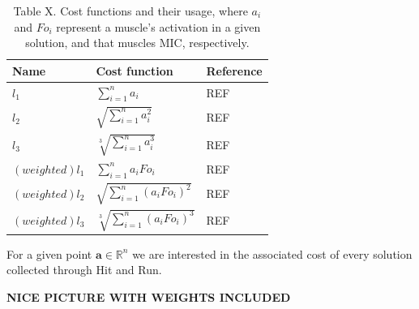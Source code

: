 \begin{table}[h]
\centering
\begin{tabular}{@{}lll@{}}
\toprule
\textbf{Name} & \textbf{Cost function} & \textbf{Reference} \\ \midrule
$l_1$            & $\sum_{i=1}^n a_i$                     & REF                \\
$l_2$            & $\sqrt{\sum_{i=1}^n a_i^2}$                     & REF                \\
$l_3$            & $\sqrt[3]{\sum_{i=1}^n a_i^3}$                     & REF                \\
$(weighted)l_1$            & $\sum_{i=1}^n a_i Fo_i$                     & REF                \\
$(weighted)l_2$            & $\sqrt{\sum_{i=1}^n (a_i Fo_i)^2}$                     & REF                \\
$(weighted)l_3$            & $\sqrt[3]{\sum_{i=1}^n (a_i Fo_i)^3}$                     & REF                \\ \bottomrule
\end{tabular}

\caption{Table X. Cost functions and their usage, where $a_i$ and $Fo_i$ represent a muscle's activation in a given solution, and that muscles MIC, respectively.}
\label{cost_function_tabls}

\end{table}

For a given point $\textbf{a} \in \mathbb{R}^n$ we are interested in the associated cost of every solution collected through Hit and Run.

\textbf{NICE PICTURE WITH WEIGHTS INCLUDED}